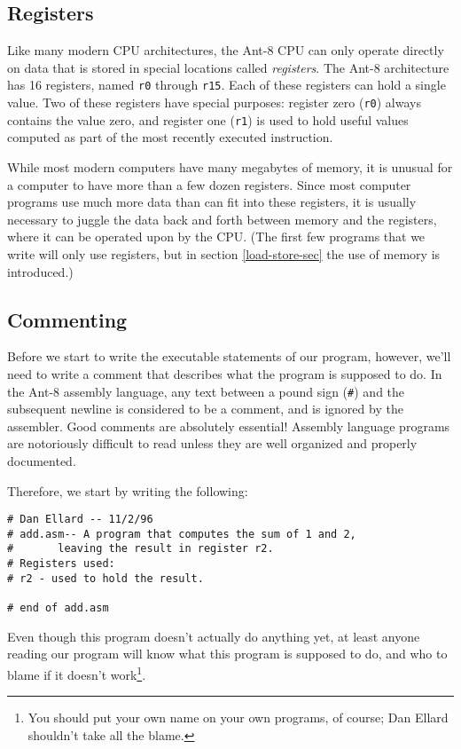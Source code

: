 \subsection{Registers}

Like many modern CPU architectures, the {\sc Ant-8} CPU can only operate
directly on data that is stored in special locations called {\em
registers}.  The {\sc Ant-8} architecture has 16 registers, named {\tt r0}
through {\tt r15}.  Each of these registers can hold a single value.
Two of these registers have special purposes: 
register zero ({\tt r0}) always contains the value zero, and register
one ({\tt r1}) is used to hold useful values computed as part of the
most recently executed instruction.

While most modern computers have many megabytes of memory, it is
unusual for a computer to have more than a few dozen registers.  Since
most computer programs use much more data than can fit into these
registers, it is usually necessary to juggle the data back and forth
between memory and the registers, where it can be operated upon by the
CPU.  (The first few programs that we write will only use registers,
but in section \ref{load-store-sec} the use of memory is introduced.)

\subsection{Commenting}

Before we start to write the executable statements of
our program, however, we'll need to write a comment that describes
what the program is supposed to do.  In the {\sc Ant-8} assembly language,
any text between a pound sign ({\tt \#}) and the subsequent newline
is considered to be a comment, and is ignored by the assembler.
Good comments are absolutely essential!
Assembly language programs are notoriously difficult to read
unless they are well organized and properly documented.

Therefore, we start by writing the following:

{\codesize
\begin{verbatim}
# Dan Ellard -- 11/2/96
# add.asm-- A program that computes the sum of 1 and 2,
#       leaving the result in register r2.
# Registers used:
# r2 - used to hold the result.

# end of add.asm
\end{verbatim}}

Even though this program doesn't actually do anything yet, at least
anyone reading our program will know what this program is supposed to do,
and who to blame if it doesn't work\footnote{
You should put your own name on your own programs, of course;
Dan Ellard shouldn't take all the blame.}.


